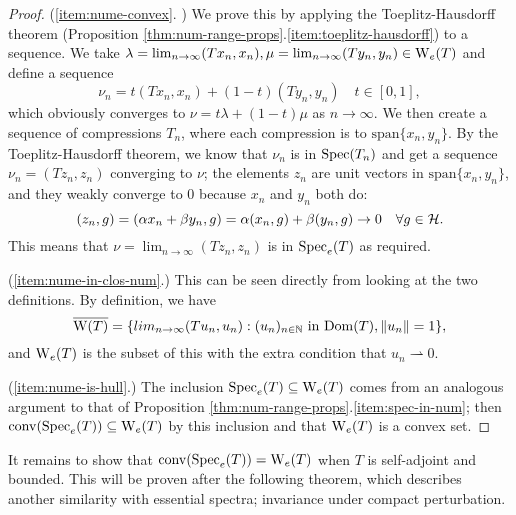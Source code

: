 \documentclass[../main.tex]{subfiles}
\begin{document}
\begin{proof}
(\ref{item:nume-convex}. \cite{bogli2020essential}) We prove this by applying
the Toeplitz-Hausdorff theorem (Proposition
\ref{thm:num-range-props}.\ref{item:toeplitz-hausdorff}) to a sequence.
We take $\lambda = \lim_{n \rightarrow \infty}(Tx_n, x_n), \mu = \lim_{n
\rightarrow \infty}(Ty_n, y_n) \in \mathrm{W}_e(T)$ and define a sequence
$$\nu_n = t(Tx_n, x_n) + (1-t)(Ty_n, y_n) \quad t \in [0, 1],$$ which
obviously converges to $\nu = t\lambda + (1-t)\mu$ as 
$n \rightarrow \infty$.
We then create a sequence of compressions $T_n$, where each compression is to
$\text{span}\{x_n, y_n\}$. By the Toeplitz-Hausdorff theorem, we know
that $\nu_n$ is in $\mathrm{Spec}(T_n)$ and get a sequence $\nu_n = (Tz_n, z_n)$
converging to $\nu$; the elements $z_n$ are unit vectors in
$\text{span}\{x_n, y_n\}$, and they weakly converge to 0 because $x_n$
and $y_n$ both do:
$$(z_n, g) = (\alpha x_n + \beta y_n, g) = \alpha(x_n, g) + \beta(y_n, g) \rightarrow 0 \quad \forall g \in \mathcal{H}.$$
This means that $\nu = \lim_{n \rightarrow \infty}(Tz_n, z_n)$ is in $\mathrm{Spec}_e(T)$ as required.

(\ref{item:nume-in-clos-num}.) This can be seen directly from looking at the two
definitions. By definition, we have
  $$\overline{\mathrm{W}(T)} = \{lim_{n \rightarrow \infty}( Tu_n, u_n ) 
			   : (u_n)_{n \in \mathbb{N}}\text{ in } \mathrm{Dom}(T),
			   \|u_n\|=1\},$$
and $\mathrm{W}_e(T)$ is the subset of this with the extra condition
that $u_n \rightharpoonup 0$.

(\ref{item:nume-is-hull}.) The inclusion $\mathrm{Spec}_e(T) \subseteq \mathrm{W}_e(T)$ comes
from an analogous argument to that of Proposition
\ref{thm:num-range-props}.\ref{item:spec-in-num}; then
$\mathrm{conv}(\mathrm{Spec}_e(T)) \subseteq \mathrm{W}_e(T)$
by this inclusion and that $\mathrm{W}_e(T)$ is a convex set.
\end{proof}
It remains to show that $\mathrm{conv}(\mathrm{Spec}_e(T)) = \mathrm{W}_e(T)$ when $T$ is self-adjoint
and bounded. This will be proven after the following theorem, which describes
another similarity with essential spectra; invariance under compact
perturbation.
\end{document}
